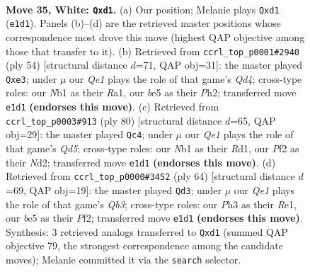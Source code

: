 \documentclass[11pt]{article}
\begin{document}
\clearpage

\begin{figure}[p]\centering
\begin{subfigure}{0.46\textwidth}\centering
\resizebox{\linewidth}{!}{%
\newchessgame
\chessboard[
  setfen={r5k1/1p3p2/q5p1/p2pb3/7p/7P/P3nPP1/RN1nQ2K w - - 0 35},
  showmover=false,
  pgfstyle=straightmove, color=movearrow, markmove={e1-d1}
]}
\caption{}
\end{subfigure}\hfill
\begin{subfigure}{0.46\textwidth}\centering
\resizebox{\linewidth}{!}{%
\newchessgame
\chessboard[
  setfen={r5k1/1p3qpp/p7/P7/3QP3/4n3/1P4PP/R6K w - - 0 28},
  showmover=false,
  pgfstyle=straightmove, color=movearrow, markmove={d4-e3}
]}
\caption{}
\end{subfigure}
\\[4pt]
\begin{subfigure}{0.46\textwidth}\centering
\resizebox{\linewidth}{!}{%
\newchessgame
\chessboard[
  setfen={8/2qr1pk1/6p1/p1nQ4/6Pp/P3P2P/3N1P2/3R2K1 w - - 1 41},
  showmover=false,
  pgfstyle=straightmove, color=movearrow, markmove={d5-c4}
]}
\caption{}
\end{subfigure}\hfill
\begin{subfigure}{0.46\textwidth}\centering
\resizebox{\linewidth}{!}{%
\newchessgame
\chessboard[
  setfen={3r3k/1p1q2pp/1pp5/3n2N1/8/1Q6/PP3PPP/4R1K1 w - - 13 33},
  showmover=false,
  pgfstyle=straightmove, color=movearrow, markmove={b3-d3}
]}
\caption{}
\end{subfigure}
\caption{\textbf{Move 35, White: \texttt{Qxd1}.} (a) Our position; Melanie plays \texttt{Qxd1} (\texttt{e1d1}). Panels (b)--(d) are the retrieved master positions whose correspondence most drove this move (highest QAP objective among those that transfer to it). (b) Retrieved from \texttt{ccrl\_top\_p0001\#2940} (ply 54) [structural distance $d$=71, QAP obj=31]: the master played \texttt{Qxe3}; under $\mu$ our \emph{Qe1} plays the role of that game's \emph{Qd4}; cross-type roles: our \emph{N}b1 as their \emph{R}a1, our \emph{b}e5 as their \emph{P}h2; transferred move \texttt{e1d1} \textbf{(endorses this move)}. (c) Retrieved from \texttt{ccrl\_top\_p0003\#913} (ply 80) [structural distance $d$=65, QAP obj=29]: the master played \texttt{Qc4}; under $\mu$ our \emph{Qe1} plays the role of that game's \emph{Qd5}; cross-type roles: our \emph{N}b1 as their \emph{R}d1, our \emph{P}f2 as their \emph{N}d2; transferred move \texttt{e1d1} \textbf{(endorses this move)}. (d) Retrieved from \texttt{ccrl\_top\_p0000\#3452} (ply 64) [structural distance $d$=69, QAP obj=19]: the master played \texttt{Qd3}; under $\mu$ our \emph{Qe1} plays the role of that game's \emph{Qb3}; cross-type roles: our \emph{P}h3 as their \emph{R}e1, our \emph{b}e5 as their \emph{P}f2; transferred move \texttt{e1d1} \textbf{(endorses this move)}. Synthesis: 3 retrieved analogs transferred to \texttt{Qxd1} (summed QAP objective 79, the strongest correspondence among the candidate moves); Melanie committed it via the \texttt{search} selector.}
\label{fig:thought-m68}
\end{figure}
\end{document}
